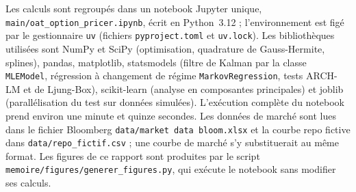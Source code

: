 Les calculs sont regroupés dans un notebook Jupyter unique, \nolinkurl{main/oat_option_pricer.ipynb}, écrit en
Python~3.12 ; l'environnement est figé par le gestionnaire \texttt{uv} (fichiers \texttt{pyproject.toml} et
\texttt{uv.lock}). Les bibliothèques utilisées sont NumPy et SciPy (optimisation, quadrature de Gauss-Hermite,
splines), pandas, matplotlib, statsmodels (filtre de Kalman par la classe \texttt{MLEModel}, régression à
changement de régime \texttt{MarkovRegression}, tests ARCH-LM et de Ljung-Box), scikit-learn (analyse en
composantes principales) et joblib (parallélisation du test sur données simulées). L'exécution complète du
notebook prend environ une minute et quinze secondes. Les données de marché sont lues dans le fichier Bloomberg
\nolinkurl{data/market data bloom.xlsx} et la courbe repo fictive dans \nolinkurl{data/repo_fictif.csv} ; une courbe de
marché s'y substituerait au même format. Les figures de ce rapport sont produites par le script
\nolinkurl{memoire/figures/generer_figures.py}, qui exécute le notebook sans modifier ses calculs.
